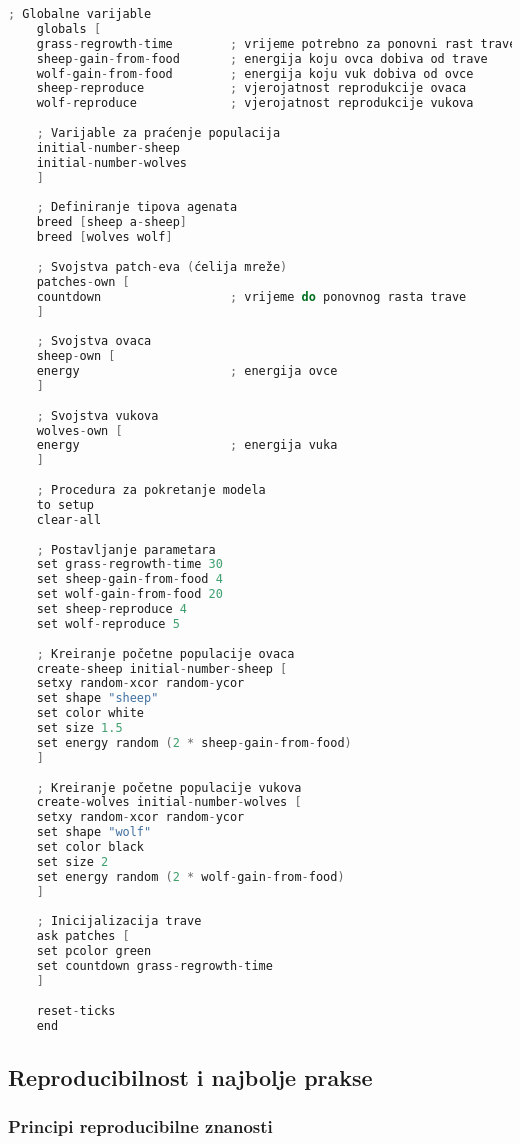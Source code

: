 \documentclass[11pt,oneside]{book}
\begin{document}
\begin{lstlisting}[language=C, caption=Agent-based predator-prey model]
	; Globalne varijable
	globals [
	grass-regrowth-time        ; vrijeme potrebno za ponovni rast trave
	sheep-gain-from-food       ; energija koju ovca dobiva od trave
	wolf-gain-from-food        ; energija koju vuk dobiva od ovce
	sheep-reproduce            ; vjerojatnost reprodukcije ovaca
	wolf-reproduce             ; vjerojatnost reprodukcije vukova
	
	; Varijable za praćenje populacija
	initial-number-sheep
	initial-number-wolves
	]
	
	; Definiranje tipova agenata
	breed [sheep a-sheep]
	breed [wolves wolf]
	
	; Svojstva patch-eva (ćelija mreže)
	patches-own [
	countdown                  ; vrijeme do ponovnog rasta trave
	]
	
	; Svojstva ovaca
	sheep-own [
	energy                     ; energija ovce
	]
	
	; Svojstva vukova
	wolves-own [
	energy                     ; energija vuka
	]
	
	; Procedura za pokretanje modela
	to setup
	clear-all
	
	; Postavljanje parametara
	set grass-regrowth-time 30
	set sheep-gain-from-food 4
	set wolf-gain-from-food 20
	set sheep-reproduce 4
	set wolf-reproduce 5
	
	; Kreiranje početne populacije ovaca
	create-sheep initial-number-sheep [
	setxy random-xcor random-ycor
	set shape "sheep"
	set color white
	set size 1.5
	set energy random (2 * sheep-gain-from-food)
	]
	
	; Kreiranje početne populacije vukova
	create-wolves initial-number-wolves [
	setxy random-xcor random-ycor
	set shape "wolf"
	set color black
	set size 2
	set energy random (2 * wolf-gain-from-food)
	]
	
	; Inicijalizacija trave
	ask patches [
	set pcolor green
	set countdown grass-regrowth-time
	]
	
	reset-ticks
	end
\end{lstlisting}

\subsection{Reproducibilnost i najbolje prakse}

\subsubsection{Principi reproducibilne znanosti}
\end{document}
